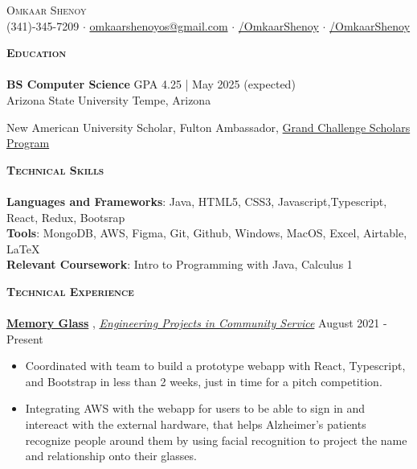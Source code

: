 \documentclass[a4paper]{article}
\newcommand{\lineunder} {
    \vspace*{-8pt} \\
    \hspace*{-18pt} \hrulefill \\
}
\newcommand{\header} [1] {
    {\hspace*{-15pt}\vspace*{3pt} \textsc{#1}}
    \vspace*{-6pt} \lineunder
}
\begin{document}
\vspace*{-30.9pt}



\vspace{-1mm}
\begin{center}
	{\Huge \scshape {Omkaar Shenoy}}\\
	\vspace{2mm}
	\faPhone  \hspace{0.5mm} (341)-345-7209 $\cdot$ \href{mailto:omkaarshenoyos@gmail.com}{\faEnvelope \hspace{0.5mm} omkaarshenoyos@gmail.com} \hspace{0.5mm}   $\cdot$ \href{https://www.linkedin.com/in/OmkaarShenoy/}{\faLinkedin/OmkaarShenoy} $\cdot$ \href{https://github.com/OmkaarShenoy}{\faGithub/OmkaarShenoy}
	
\end{center}




    \header{\textbf{Education}}

    \textbf{BS Computer Science} \hfill GPA 4.25 | May 2025 (expected)
\\ Arizona State University \hfill Tempe, Arizona
 
New American University Scholar, Fulton Ambassador, \href{https://gcsp.engineering.asu.edu/}{Grand Challenge Scholars Program} \faExternalLink \\


\vspace{1mm}

\header{\textbf{Technical Skills}}



\textbf{Languages and Frameworks}: Java, HTML5, CSS3, Javascript,Typescript, React, Redux, Bootsrap \\
\textbf{Tools}: MongoDB, AWS, Figma, Git, Github, Windows, MacOS, Excel, Airtable, \LaTeX \\
\textbf{Relevant Coursework}: Intro to Programming with Java, Calculus 1 \\
\vspace{1mm}


\header{\textbf{Technical Experience}}
\href{https://www.memoryglass.net}{\textbf{Memory Glass}}  \faExternalLink, \href{https://epics.engineering.asu.edu/}{\textit{Engineering Projects in Community Service}} \faExternalLink
\hfill August 2021 - Present\\
\vspace{-3mm}
\begin{itemize}
    \item Coordinated with team to build a prototype webapp with React, Typescript, and Bootstrap in less than 2 weeks, just in time for a pitch competition. 
    \item Integrating AWS with the webapp for users to be able to sign in and intereact with the external hardware, that helps Alzheimer's patients recognize people around them by using facial recognition to project the name and relationship onto their glasses. 
    
\end{itemize}
\end{document}
